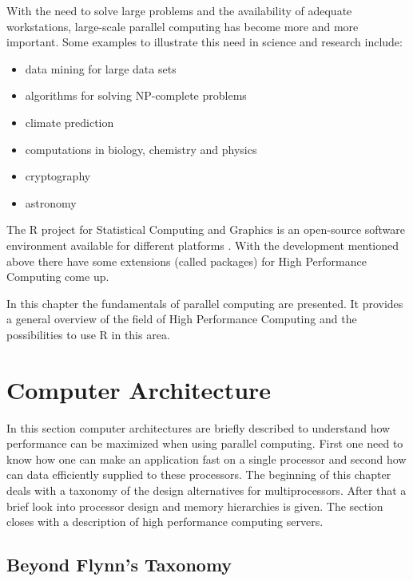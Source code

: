 With the need to solve large problems and the availability of adequate
workstations, large-scale parallel computing has become more and more
important. Some examples to illustrate this need in science and
research include:
\begin{itemize}
\item data mining for large data sets
\item algorithms for solving NP-complete problems
\item climate prediction
\item computations in biology, chemistry and physics
\item cryptography
\item astronomy
\end{itemize}

The R project for Statistical Computing and Graphics is an open-source
software environment available for different platforms \cite{R}. With the
development mentioned above there have some extensions (called
packages) for High Performance Computing come up.

In this chapter the fundamentals of parallel computing are
presented. It provides a general overview of the field of High
Performance Computing and the possibilities to use R in this area.


\section{Computer Architecture}
In this section computer architectures are briefly described to
understand how performance can be maximized when using parallel
computing. First one need to know how one can make an application fast
on a single processor and second how can data efficiently supplied to
these processors. The beginning of this chapter deals with a taxonomy of
the design alternatives for multiprocessors. After that a brief look
into processor design and memory hierarchies is given. The section closes with a description of high performance computing
servers.

\subsection{Beyond Flynn's Taxonomy}

